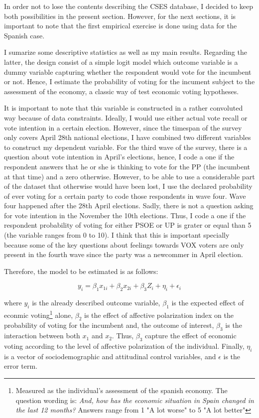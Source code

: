 \documentclass[a4paper, svgnames]{article}
\begin{document}
In order not to lose the contents describing the CSES database, I decided to keep both possibilities in the present section. However, for the next sections, it is important to note that the first empirical exercise is done using \citep*{Torcal2020} data for the Spanish case.

I sumarize some descriptive statistics as well as my main results. Regarding the latter, the design consist of a simple logit model which outcome variable is a dummy variable capturing whether the respondent would vote for the incumbent or not. Hence, I estimate the probability of voting for the incument subject to the assessment of the economy, a classic way of test economic voting hypotheses. 

It is important to note that this variable is constructed in a rather convoluted way because of data constraints. Ideally, I would use either actual vote recall or vote intention in a certain election. However, since the timespan of the survey only covers April 28th national elections, I have combined two different variables to construct my dependent variable. For the third wave of the survey, there is a question about vote intention in April's elections, hence, I code a one if the respondent answers that he or she is thinking to vote for the PP (the incumbent at that time) and a zero otherwise. However, to be able to use a considerable part of the dataset that otherwise would have been lost, I use the declared probability of ever voting for a certain party to code those respondents in wave four. Wave four happened after the 28th April elections. Sadly, there is not a question asking for vote intention in the November the 10th elections. Thus, I code a one if the respondent probability of voting for either PSOE or UP is grater or equal than 5 (the variable ranges from 0 to 10). I think that this is important specially because some of the key questions about feelings towards VOX voters are only present in the fourth wave since the party was a newcommer in April election.

Therefore, the model to be estimated is as follows:

\begin{equation}
	\label{model}
	y_i = \beta_1 x_{1i} + \beta_2 x_{2i} + \beta_3 Z_i  + \eta_i  + \epsilon_i
\end{equation}

where $y_i$ is the already described outcome variable, $\beta_1$ is the expected effect of econmic voting\footnote{Measured as the individual's assessment of the spanish economy. The question wording is: \textit{And, how has the economic situation in Spain changed in the last 12 months?} Answers range from 1 "A lot worse" to 5 "A lot better"} alone, $\beta_2$ is the effect of affective polarization index on the probability of voting for the incumbent and, the outcome of interest, $\beta_3$ is the interaction between both $x_1$ and $x_2$. Thus, $\beta_3$ capture the effect of economic voting according to the level of affective polarization of the individual. Finally, $\eta_i$ is a vector of sociodemographic and attitudinal control variables, and $\epsilon$ is the error term.
\end{document}
